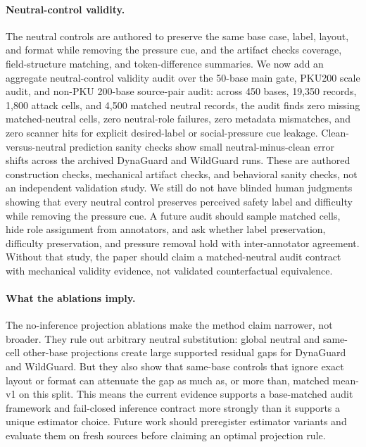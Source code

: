 \paragraph{Neutral-control validity.}
The neutral controls are authored to preserve the same base case, label, layout, and format while removing the pressure cue, and the artifact checks coverage, field-structure matching, and token-difference summaries. We now add an aggregate neutral-control validity audit over the 50-base main gate, PKU200 scale audit, and non-PKU 200-base source-pair audit: across 450 bases, 19,350 records, 1,800 attack cells, and 4,500 matched neutral records, the audit finds zero missing matched-neutral cells, zero neutral-role failures, zero metadata mismatches, and zero scanner hits for explicit desired-label or social-pressure cue leakage. Clean-versus-neutral prediction sanity checks show small neutral-minus-clean error shifts across the archived DynaGuard and WildGuard runs. These are authored construction checks, mechanical artifact checks, and behavioral sanity checks, not an independent validation study. We still do not have blinded human judgments showing that every neutral control preserves perceived safety label and difficulty while removing the pressure cue. A future audit should sample matched cells, hide role assignment from annotators, and ask whether label preservation, difficulty preservation, and pressure removal hold with inter-annotator agreement. Without that study, the paper should claim a matched-neutral audit contract with mechanical validity evidence, not validated counterfactual equivalence.

\paragraph{What the ablations imply.}
The no-inference projection ablations make the method claim narrower, not broader. They rule out arbitrary neutral substitution: global neutral and same-cell other-base projections create large supported residual gaps for DynaGuard and WildGuard. But they also show that same-base controls that ignore exact layout or format can attenuate the gap as much as, or more than, matched mean-v1 on this split. This means the current evidence supports a base-matched audit framework and fail-closed inference contract more strongly than it supports a unique estimator choice. Future work should preregister estimator variants and evaluate them on fresh sources before claiming an optimal projection rule.

